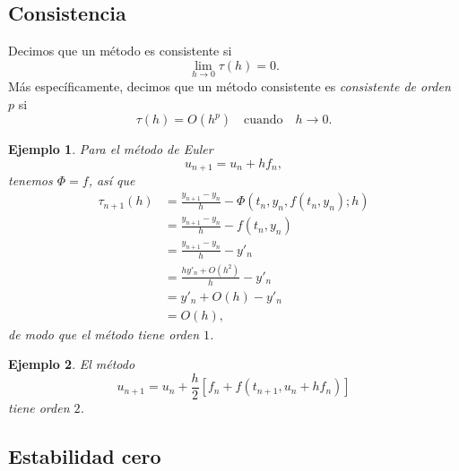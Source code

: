 \documentclass[11pt,letterpaper]{report}
\newtheorem{example}{Ejemplo}
\begin{document}
\subsection{Consistencia}

Decimos que un método es consistente si
\begin{equation}
  \lim_{h\to 0}\tau(h) = 0
.\end{equation}
Más específicamente, decimos que un método consistente es
\emph{consistente de orden $p$} si
\begin{equation}
  \tau(h) = O(h^p) \quad \text{cuando} \quad h\to 0
.\end{equation}

\begin{example}
  Para el método de Euler
  \begin{equation}
    u_{n+1} = u_n + hf_n
  ,\end{equation}
  tenemos $\Phi = f$, así que
  \begin{align}
    \tau_{n+1}(h)
    &= \frac{y_{n+1}-y_n}{h}-\Phi(t_n,y_n,f(t_n,y_n);h) \\
    &= \frac{y_{n+1}-y_n}{h}-f(t_n,y_n) \\
    &= \frac{y_{n+1}-y_n}{h}-y'_n \\
    &= \frac{hy'_n + O(h^2)}{h}-y'_n \\
    &= y'_n + O(h)-y'_n \\
    &= O(h)
  ,\end{align}
  de modo que el método tiene orden $1$.
\end{example}

\begin{example}
  El método
  \begin{equation}
    u_{n+1} = u_n + \frac{h}{2}
    \left[ f_n + f(t_{n+1},u_n + hf_n) \right]
  \end{equation}
  tiene orden $2$.
\end{example}

\subsection{Estabilidad cero}
\end{document}
